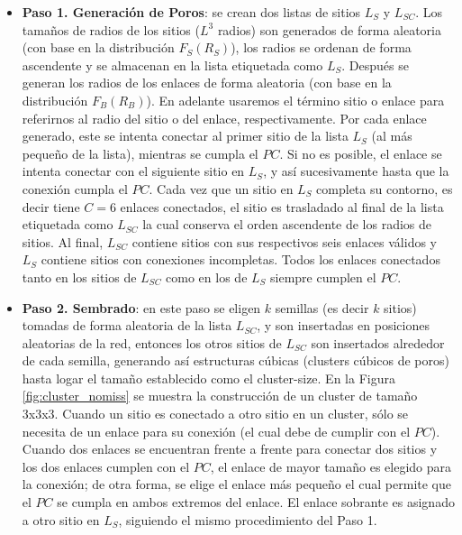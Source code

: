 \begin{itemize}
\item[] \textbf{Paso 1. Generación de Poros}: se crean dos listas de sitios $L_{S}$ y $L_{SC}$. Los tamaños de radios de los sitios ($L^3$ radios)
son generados de forma aleatoria (con base en la distribución $F_S(R_S)$), los radios se ordenan de forma ascendente y se almacenan en la lista 
etiquetada como $L_{S}$. 
Después se generan los radios de los enlaces  de forma aleatoria (con base en la distribución $F_B(R_B)$). En adelante usaremos el término 
sitio o enlace para referirnos al radio del sitio o del enlace, respectivamente. Por cada enlace generado, 
este se intenta conectar al primer sitio de la lista $L_{S}$ (al más pequeño de la lista), mientras se cumpla el $PC$. Si no es posible, 
el enlace se intenta conectar con el siguiente sitio en $L_{S}$, y así sucesivamente hasta que la conexión cumpla el $PC$. Cada vez que 
un sitio en $L_{S}$ completa su contorno, es decir tiene $C=6$ enlaces conectados, el sitio es trasladado al final de la lista etiquetada 
como $L_{SC}$ la cual conserva el orden ascendente de los radios de sitios. Al final, $L_{SC}$ contiene sitios 
con sus respectivos seis enlaces válidos y $L_{S}$ contiene sitios con conexiones incompletas. Todos los enlaces conectados 
tanto en los sitios de $L_{SC}$ como en los de $L_{S}$ siempre cumplen el $PC$.\\

\item[] \textbf{Paso 2. Sembrado}: en este paso se eligen $k$ semillas (es decir $k$ sitios) tomadas de forma aleatoria de la lista $L_{SC}$, y 
son insertadas en posiciones aleatorias de la red, entonces los otros sitios de $L_{SC}$ son insertados alrededor de cada semilla, generando
así estructuras cúbicas (clusters cúbicos de poros) hasta logar el tamaño establecido como el cluster-size. En la Figura \ref{fig:cluster_nomiss}  se muestra la 
construcción de un cluster de tamaño 3x3x3. Cuando un sitio es conectado a otro sitio en un cluster, sólo se 
necesita de un enlace para su conexión (el cual debe de cumplir con el $PC$). Cuando dos enlaces se encuentran frente a frente para conectar 
dos sitios y los dos enlaces cumplen con el $PC$, el enlace de mayor tama\~no es elegido para la conexión; de otra forma, se elige el enlace 
más pequeño el cual permite que el $PC$ se cumpla en ambos extremos del enlace. El enlace sobrante es asignado a otro sitio en $L_{S}$, 
siguiendo el mismo procedimiento del Paso 1.\\


\end{itemize}
